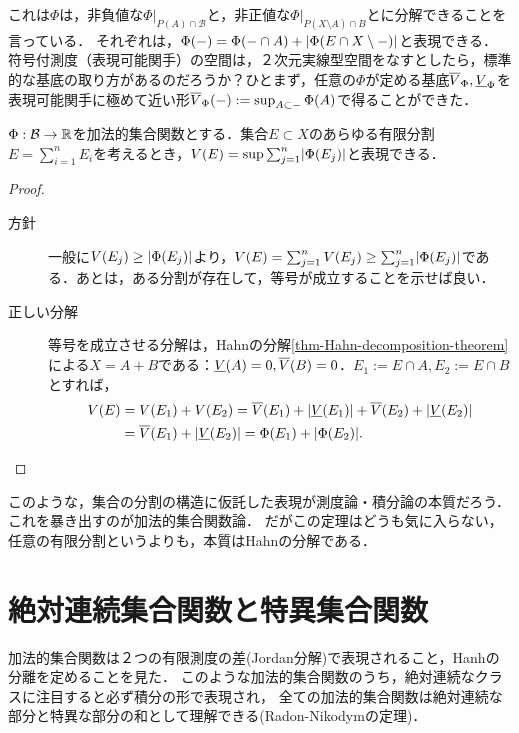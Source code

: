 \documentclass[uplatex, dvipdfmx]{jsreport}
\renewcommand{\B}{\mathcal{B}}
\begin{document}
\begin{remarks}
    これは$\Phi$は，非負値な$\Phi|_{P(A)\cap\B}$と，非正値な$\Phi|_{P(X\setminus A)\cap B}$とに分解できることを言っている．
    それぞれは，$\Phi(-)=\Phi(-\cap A)+\lvert\Phi(E\cap X\setminus-)\rvert$と表現できる．
    符号付測度（表現可能関手）の空間は，２次元実線型空間をなすとしたら，標準的な基底の取り方があるのだろうか？ひとまず，任意の$\Phi$が定める基底$\overline{V}_\Phi,\underline{V}_\Phi$を表現可能関手に極めて近い形$\overline{V}_\Phi(-):=\sup_{A\subset-}\Phi(A)$で得ることができた．
\end{remarks}

\begin{theorem}
    $\Phi:\B\to\R$を加法的集合関数とする．集合$E\subset X$のあらゆる有限分割$E=\sum^n_{i=1}E_i$を考えるとき，$V(E)=\sup\sum^n_{j=1}\lvert\Phi(E_j)\rvert$と表現できる．
\end{theorem}
\begin{proof}\mbox{}
    \begin{description}
        \item[方針] 一般に$V(E_j)\ge\lvert\Phi(E_j)\rvert$より，$V(E)=\sum^n_{j=1}V(E_j)\ge\sum^n_{j=1}\lvert\Phi(E_j)\rvert$である．あとは，ある分割が存在して，等号が成立することを示せば良い．
        \item[正しい分解] 等号を成立させる分解は，Hahnの分解\ref{thm-Hahn-decomposition-theorem}による$X=A+B$である：$\underline{V}(A)=0,\overline{V}(B)=0$．$E_1:=E\cap A,E_2:=E\cap B$とすれば， \begin{align*}
            V(E)&=V(E_1)+V(E_2)=\overline{V}(E_1)+\lvert\underline{V}(E_1)\rvert+\overline{V}(E_2)+\lvert\underline{V}(E_2)\rvert\\
            &=\overline{V}(E_1)+\lvert\underline{V}(E_2)\rvert=\Phi(E_1)+\lvert\Phi(E_2)\rvert.
        \end{align*}
    \end{description}
\end{proof}
\begin{remarks}
    このような，集合の分割の構造に仮託した表現が測度論・積分論の本質だろう．
    これを暴き出すのが加法的集合関数論．
    だがこの定理はどうも気に入らない，任意の有限分割というよりも，本質はHahnの分解である．
\end{remarks}

\section{絶対連続集合関数と特異集合関数}

\begin{tcolorbox}[colframe=ForestGreen, colback=ForestGreen!10!white,breakable,colbacktitle=ForestGreen!40!white,coltitle=black,fonttitle=\bfseries\sffamily,
title=]
    加法的集合関数は２つの有限測度の差(Jordan分解)で表現されること，Hanhの分離を定めることを見た．
    このような加法的集合関数のうち，絶対連続なクラスに注目すると必ず積分の形で表現され，
    全ての加法的集合関数は絶対連続な部分と特異な部分の和として理解できる(Radon-Nikodymの定理)．
\end{tcolorbox}
\end{document}

